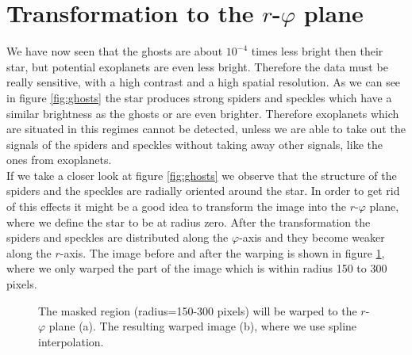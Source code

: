 \section{Transformation to the $r$-$\varphi$ plane}
\label{sec:interpolation}
We have now seen that the ghosts are about $10^{-4}$ times less bright then their star, but potential exoplanets are even less bright. Therefore the data must be really sensitive, with a high contrast and a high spatial resolution. As we can see in figure \ref{fig:ghosts} the star produces strong spiders and speckles which have a similar brightness as the ghosts or are even brighter. Therefore exoplanets which are situated in this regimes cannot be detected, unless we are able to take out the signals of the spiders and speckles without taking away other signals, like the ones from exoplanets.\\
If we take a closer look at figure \ref{fig:ghosts} we observe that the structure of the spiders and the speckles are radially oriented around the star. In order to get rid of this effects it might be a good idea to transform the image into the $r$-$\varphi$ plane, where we define the star to be at radius zero. After the transformation the spiders and speckles are distributed along the $\varphi$-axis and they become weaker along the $r$-axis. The image before and after the warping is shown in figure \ref{fig:warping_R150-300}, where we only warped the part of the image which is within radius 150 to 300 pixels. \\
\begin{figure}[H]
	\centering
\caption{The masked region (radius=150-300 pixels) will be warped to the $r$-$\varphi$ plane (a). The resulting warped image (b), where we use spline interpolation.}
\label{fig:warping_R150-300}
\end{figure}
